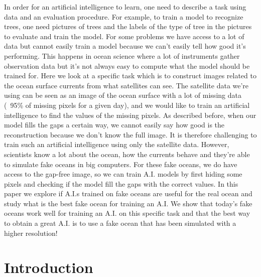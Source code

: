 \documentclass[draft]{agujournal2019}
\begin{document}
In order for an artificial intelligence to learn, one need to describe a task using data and an evaluation procedure. For example, to train a model to recognize trees, one need pictures of trees and the labels of the type of tree in the pictures to evaluate and train the model.
For some problems we have access to a lot of data but cannot easily train a model because we can't easily tell how good it's performing. This happens in ocean science where a lot of instruments gather observation data but it's not always easy to compute what the model should be trained for.
Here we look at a specific task which is to construct images related to the ocean surface currents from what satellites can see. The satellite data we're using can be seen as an image of the ocean surface with a lot of missing data (~95\% of missing pixels for a given day), and we would like to train an artificial intelligence to find the values of the missing pixels.
As described before, when our model fills the gaps a certain way, we cannot easily say how good is the reconstruction because we don't know the full image. It is therefore challenging to train such an artificial intelligence using only the satellite data.
However, scientists know a lot about the ocean, how the currents behave and they're able to simulate fake oceans in big computers. For these fake oceans, we do have access to the gap-free image, so we can train A.I. models by first hiding some pixels and checking if the model fill the gaps with the correct values.
In this paper we explore if A.I.s trained on fake oceans are useful for the real ocean and study what is the best fake ocean for training an A.I.
We show that today's fake oceans work well for training an A.I. on this specific task and that the best way to obtain a great A.I. is to use a fake ocean that has been simulated with a higher resolution!


\section{Introduction}





\end{document}
